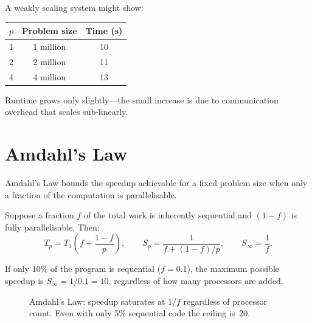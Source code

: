 \begin{ppexample}
A weakly scaling system might show:
\begin{center}
\begin{tabular}{ccc}
\toprule
$p$ & Problem size & Time (s) \\
\midrule
1  & 1 million & 10 \\
2  & 2 million & 11 \\
4  & 4 million & 13 \\
\bottomrule
\end{tabular}
\end{center}
Runtime grows only slightly---the small increase is due to communication
overhead that scales sub-linearly.
\end{ppexample}

\section{Amdahl's Law}

\begin{ppkey}
Amdahl's Law bounds the speedup achievable for a fixed problem size when
only a fraction of the computation is parallelisable.
\end{ppkey}

Suppose a fraction $f$ of the total work is inherently sequential and
$(1 - f)$ is fully parallelisable. Then:
\[
  T_p = T_1\!\left(f + \frac{1-f}{p}\right),
  \qquad
  S_p = \frac{1}{f + (1-f)/p},
  \qquad
  S_\infty = \frac{1}{f}.
\]

\begin{ppexample}
If only 10\% of the program is sequential ($f = 0.1$), the maximum possible
speedup is $S_\infty = 1/0.1 = 10$, regardless of how many processors are
added.
\end{ppexample}

\begin{figure}[h]
\centering
{}
\caption{Amdahl's Law: speedup saturates at $1/f$ regardless of processor count.
         Even with only 5\% sequential code the ceiling is~20.}
\label{fig:amdahl-speedup}
\end{figure}

